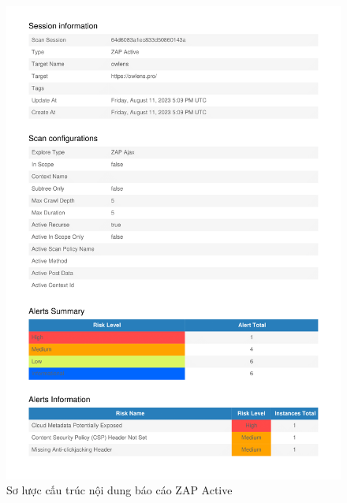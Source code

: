 \begin{figure}[H]
      \centering
      \includegraphics[width=\textwidth]{applied-thesis-chapters/chapter-6/Sơ lược cấu trúc nội dung báo cáo ZAP Active.png}
      \caption{Sơ lược cấu trúc nội dung báo cáo ZAP Active}
      \label{fig:SoLuocCauTrucNoiDungBaoCaoZapActive}
\end{figure}

